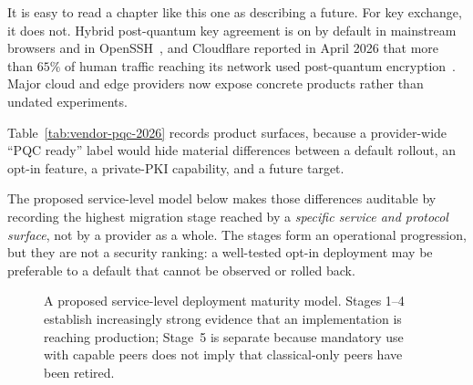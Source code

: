 It is easy to read a chapter like this one as describing a future. For key
exchange, it does not. Hybrid post-quantum key agreement is on by default in
mainstream browsers and in OpenSSH~\cite{opensshpq}, and Cloudflare reported in
April 2026 that more than $65\%$ of human traffic reaching its network used
post-quantum encryption~\cite{cloudflareroadmap2026}. Major cloud and edge
providers now expose concrete products rather than undated experiments.

Table~\ref{tab:vendor-pqc-2026} records product surfaces, because a provider-wide
``PQC ready'' label would hide material differences between a default rollout,
an opt-in feature, a private-PKI capability, and a future target.

The proposed service-level model below makes those differences auditable by
recording the highest migration stage reached by a \emph{specific service and
protocol surface}, not by a provider
as a whole. The stages form an operational progression, but they are not a
security ranking: a well-tested opt-in deployment may be preferable to a default
that cannot be observed or rolled back.

\begin{figure}[H]
\centering
{}
\caption{A proposed service-level deployment maturity model. Stages 1--4 establish
increasingly strong evidence that an implementation is reaching production;
Stage~5 is separate because mandatory use with capable peers does not imply that
classical-only peers have been retired.}
\label{fig:pqc-deployment-maturity}
\end{figure}

